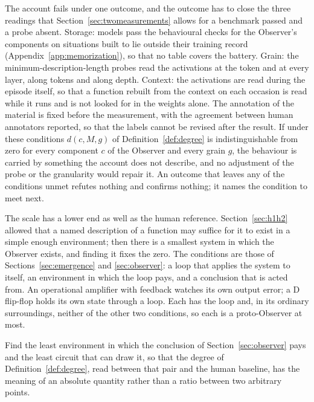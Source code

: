 The account fails under one outcome, and the outcome has to close the three readings that
Section~\ref{sec:twomeasurements} allows for a benchmark passed and a probe absent. Storage: models
pass the behavioural checks for the Observer's components on situations built to lie outside their
training record (Appendix~\ref{app:memorization}), so that no table covers the battery. Grain: the
minimum-description-length probes read the activations at the token and at every layer, along tokens
and along depth. Context: the activations are read during the episode itself, so that a function
rebuilt from the context on each occasion is read while it runs and is not looked for in the weights
alone. The annotation of the material is fixed before the measurement, with the agreement between
human annotators reported, so that the labels cannot be revised after the result. If under these
conditions $d(c, M, g)$ of Definition~\ref{def:degree} is indistinguishable from zero for every
component $c$ of the Observer and every grain $g$, the behaviour is carried by something the account
does not describe, and no adjustment of the probe or the granularity would repair it. An outcome that leaves any of the conditions unmet refutes nothing and confirms nothing; it
names the condition to meet next.

The scale has a lower end as well as the human reference. Section~\ref{sec:h1h2} allowed that a named
description of a function may suffice for it to exist in a simple enough environment; then there is a
smallest system in which the Observer exists, and finding it fixes the zero. The conditions are those
of Sections~\ref{sec:emergence} and \ref{sec:observer}: a loop that applies the system to itself, an
environment in which the loop pays, and a conclusion that is acted from. An operational amplifier with
feedback watches its own output error; a D flip-flop holds its own state through a loop. Each has the
loop and, in its ordinary surroundings, neither of the other two conditions, so each is a
proto-Observer at most.

\begin{problem}
\label{prob:zero}
Find the least environment in which the conclusion of Section~\ref{sec:observer} pays and the least
circuit that can draw it, so that the degree of Definition~\ref{def:degree}, read between that pair and
the human baseline, has the meaning of an absolute quantity rather than a ratio between two arbitrary
points.
\end{problem}
